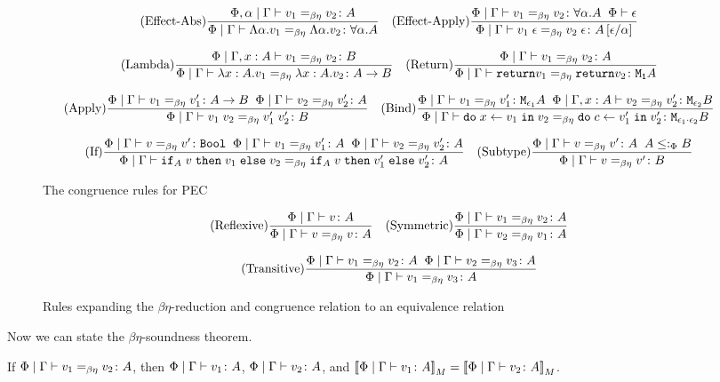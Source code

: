 \documentclass{Report}
\begin{document}
\begin{figure}[h!]
    \[
        (\text{Effect-Abs}) \frac{\Phi, \alpha\mid\Gamma \vdash v_1 =_{\beta\eta} v_2 \colon A}{\Phi\mid\Gamma \vdash \Lambda \alpha. v_1 =_{\beta\eta} \Lambda \alpha. v_2 \colon \forall \alpha. A}
        \quad
        (\text{Effect-Apply}) \frac{\Phi\mid\Gamma \vdash v_1 =_{\beta\eta} v_2 \colon \forall \alpha. A\;\;\Phi\vdash \epsilon}{\Phi\mid\Gamma \vdash v_1\;\epsilon =_{\beta\eta} v_2\;\epsilon \colon A\left[\epsilon / \alpha\right]}
    \]

    \[
        (\text{Lambda}) \frac{\Phi\mid\Gamma, x: A \vdash v_1 =_{\beta\eta} v_2 \colon B}{\Phi\mid\Gamma \vdash \lambda x : A. v_1 =_{\beta\eta} \lambda x : A. v_2 \colon A\rightarrow B}
        \quad
        (\text{Return}) \frac{\Phi\mid\Gamma \vdash v_1 =_{\beta\eta} v_2 \colon A}{\Phi\mid\Gamma \vdash \texttt{return} v_1 =_{\beta\eta} \texttt{return} v_2 \colon \texttt{M}_{\texttt{1}}{A}}
    \]

    \[
        (\text{Apply}) \frac{\Phi\mid\Gamma \vdash v_1 =_{\beta\eta} v_1' \colon A\rightarrow B\;\;\Phi\mid\Gamma \vdash v_2 =_{\beta\eta} v_2' \colon A}{\Phi\mid\Gamma \vdash v_1\; v_2 =_{\beta\eta} v_1'\; v_2' \colon B}
        \quad   
        (\text{Bind}) \frac{\Phi\mid\Gamma \vdash v_1 =_{\beta\eta} v_1' \colon \texttt{M}_{\epsilon_1}{A} \;\; \Phi\mid\Gamma, x: A \vdash v_2 =_{\beta\eta} v_2' \colon \texttt{M}_{\epsilon_2}{B}}{\Phi\mid\Gamma \vdash \texttt{do}\; x \leftarrow v_1 \;\texttt{in}\; v_2 =_{\beta\eta} \texttt{do}\; c \leftarrow v_1' \;\texttt{in}\; v_2' \colon \texttt{M}_{\epsilon_1 \cdot \epsilon_2}{B}} 
    \]

    \[
        (\text{If}) \frac{\Phi\mid\Gamma \vdash v =_{\beta\eta} v' \colon \texttt{Bool} \;\; \Phi\mid\Gamma \vdash v_1 =_{\beta\eta} v_1' \colon A\;\;\Phi\mid\Gamma \vdash v_2 =_{\beta\eta} v_2' \colon A}{\Phi\mid\Gamma \vdash \texttt{if}_{A}\; v\; \texttt{then}\; v_1 \;\texttt{else} \; v_2 =_{\beta\eta} \texttt{if}_{A}\; v\; \texttt{then}\; v_1' \;\texttt{else} \; v_2' \colon A}
        \quad    
        (\text{Subtype}) \frac{\Phi\mid\Gamma \vdash v =_{\beta\eta} v' \colon A \;\; A \leq:_\Phi B}{\Phi\mid\Gamma \vdash v =_{\beta\eta} v' \colon B}
    \]
    \caption{The congruence rules for PEC}
    \label{BetaEtaCongruence}
\end{figure}

\begin{figure}
    \[
        (\text{Reflexive}) \frac{\Phi\mid\Gamma \vdash v \colon A}{\Phi\mid\Gamma \vdash v =_{\beta\eta} v \colon A}
        \quad
        (\text{Symmetric}) \frac{\Phi\mid\Gamma \vdash v_1 =_{\beta\eta} v_2 \colon A}{\Phi\mid\Gamma \vdash v_2 =_{\beta\eta} v_1 \colon A}
    \]

    \[
        (\text{Transitive}) \frac{\Phi\mid\Gamma \vdash v_1 =_{\beta\eta} v_2 \colon A\;\;\Phi\mid\Gamma \vdash v_2 =_{\beta\eta} v_3 \colon A}{\Phi\mid\Gamma \vdash v_1 =_{\beta\eta} v_3 \colon A}
    \]
    \caption{Rules expanding the $\beta\eta$-reduction and congruence relation to an equivalence relation}
    \label{BetaEtaEquivalence}
\end{figure}


Now we can state the $\beta\eta$-soundness theorem. 

\begin{theorem}[Soundness]
    If $\Phi\mid\Gamma \vdash v_1 =_{\beta\eta} v_2 \colon A$, then $\Phi\mid\Gamma \vdash v_1 \colon A$, $\Phi\mid\Gamma \vdash v_2 \colon A$, and ${\bf [\![}\Phi\mid\Gamma \vdash v_1 \colon A{\bf ]\!]}_M = {\bf [\![}\Phi\mid\Gamma \vdash v_2 \colon A{\bf ]\!]}_M$.
\end{theorem}
\end{document}

